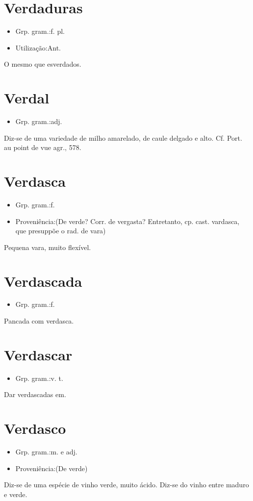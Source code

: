 \documentclass{article}
\begin{document}
\section{Verdaduras}
\begin{itemize}
\item {Grp. gram.:f. pl.}
\end{itemize}
\begin{itemize}
\item {Utilização:Ant.}
\end{itemize}
O mesmo que \textunderscore esverdados\textunderscore .
\section{Verdal}
\begin{itemize}
\item {Grp. gram.:adj.}
\end{itemize}
Diz-se de uma variedade de milho amarelado, de caule delgado e alto. Cf. \textunderscore Port. au point de vue agr.\textunderscore , 578.
\section{Verdasca}
\begin{itemize}
\item {Grp. gram.:f.}
\end{itemize}
\begin{itemize}
\item {Proveniência:(De \textunderscore verde\textunderscore ? Corr. de \textunderscore vergasta\textunderscore ? Entretanto, cp. cast. \textunderscore vardasca\textunderscore , que presuppõe o rad. de \textunderscore vara\textunderscore )}
\end{itemize}
Pequena vara, muito flexível.
\section{Verdascada}
\begin{itemize}
\item {Grp. gram.:f.}
\end{itemize}
Pancada com verdasca.
\section{Verdascar}
\begin{itemize}
\item {Grp. gram.:v. t.}
\end{itemize}
Dar verdascadas em.
\section{Verdasco}
\begin{itemize}
\item {Grp. gram.:m.  e  adj.}
\end{itemize}
\begin{itemize}
\item {Proveniência:(De \textunderscore verde\textunderscore )}
\end{itemize}
Diz-se de uma espécie de vinho verde, muito ácido.
Diz-se do vinho entre maduro e verde.
\end{document}
